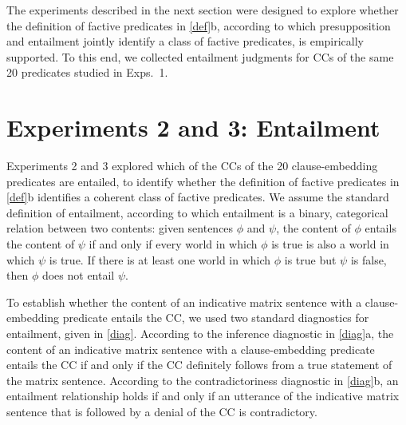 \documentclass{language}
\newcommand{\6}{\mbox{$[\hspace*{-.6mm}[$}}
\newcommand{\9}{\mbox{$]\hspace*{-.6mm}]$}}
\begin{document}
The experiments described in the next section were designed to explore whether the definition of factive predicates in \ref{def}b, according to which presupposition and entailment jointly identify a class of factive predicates, is empirically supported. To this end, we collected entailment judgments for CCs of the same 20 predicates studied in Exps.~1.

\section{Experiments 2 and 3: Entailment}\label{s3}

Experiments 2 and 3 explored which of the CCs of the 20 clause-embedding predicates are entailed, to identify whether the definition of factive predicates in \ref{def}b identifies a coherent class of factive predicates. We assume the standard definition of entailment, according to which entailment is a binary, categorical relation between two contents: given sentences $\phi$ and $\psi$, the content of $\phi$ entails the content of $\psi$ if and only if every world in which $\phi$ is true is also a world in which $\psi$ is true. If there is at least one world in which $\phi$ is true but $\psi$ is false, then $\phi$ does not entail $\psi$. 

To establish whether the content of an indicative matrix sentence with a clause-embedding predicate entails the CC, we used two standard diagnostics for entailment, given in \ref{diag}. According to the {\sc inference diagnostic} in \ref{diag}a, the content of an indicative matrix sentence with a clause-embedding predicate entails the CC if and only if the CC definitely follows from a true statement of the matrix sentence. According to the {\sc contradictoriness diagnostic} in \ref{diag}b, an entailment relationship holds if and only if an utterance of the indicative matrix sentence that is followed by a denial of the CC is contradictory. 
\end{document}
